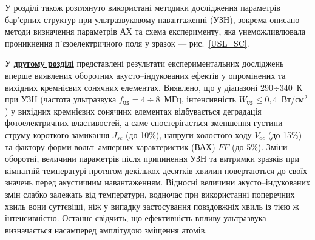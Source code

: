У розділі також розглянуто використані методики дослідження параметрів бар'єрних структур при ультразвуковому навантаженні (УЗН),
зокрема описано методи визначення параметрів АХ та
схема експерименту, яка унеможливлювала проникнення п'єзоелектричного поля у зразок --- рис.~\ref{USL_SC}.







У  \underline{\textbf{другому розділі}} представлені результати експериментальних досліджень вперше виявлених оборотних акусто--індукованих ефектів у опромінених та вихідних кремнієвих сонячних елементах.
Виявлено, що
   у діапазоні 290$\div$340~К при УЗН (частота ультразвука $f_\mathtt{US}=4\div8$~МГц, інтенсивність $W_\mathtt{US}\leq0,4$~Вт/см$^2$) у вихідних кремнієвих сонячних елементах  відбувається деградація
фотоелектричних властивостей, а саме
спостерігається зменшення густини струму короткого замикання $J_{sc}$ (до 10\%), напруги холостого ходу $V_{oc}$ (до 15\%) та фактору форми вольт--амперних характеристик (ВАХ) $F\!F$ (до 5\%).
Зміни оборотні, величини параметрів  після припинення УЗН  та витримки зразків при кімнатній температурі протягом декількох десятків хвилин повертаються до своїх значень перед акустичним навантаженням.
Відносні величини акусто--індукованих змін слабко залежать від температури, водночас при використанні поперечних хвиль вони суттєвіші, ніж у випадку застосування повздовжніх хвиль із тією ж інтенсивністю.
Останнє свідчить, що ефективність впливу ультразвука визначається насамперед амплітудою зміщення атомів.


